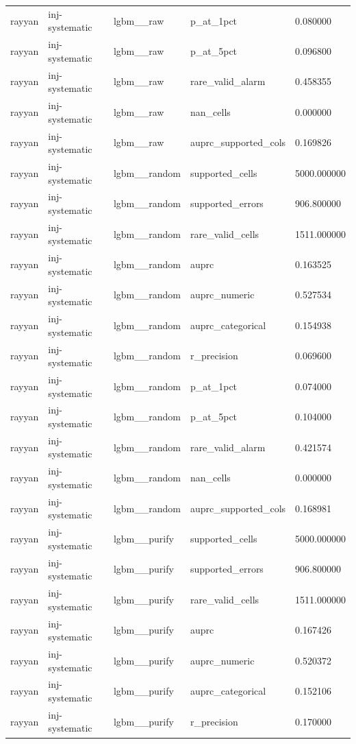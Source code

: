 \begin{tabular}{lllll}
rayyan & inj-systematic & lgbm\_\_raw & p\_at\_1pct & 0.080000 \\
rayyan & inj-systematic & lgbm\_\_raw & p\_at\_5pct & 0.096800 \\
rayyan & inj-systematic & lgbm\_\_raw & rare\_valid\_alarm & 0.458355 \\
rayyan & inj-systematic & lgbm\_\_raw & nan\_cells & 0.000000 \\
rayyan & inj-systematic & lgbm\_\_raw & auprc\_supported\_cols & 0.169826 \\
rayyan & inj-systematic & lgbm\_\_random & supported\_cells & 5000.000000 \\
rayyan & inj-systematic & lgbm\_\_random & supported\_errors & 906.800000 \\
rayyan & inj-systematic & lgbm\_\_random & rare\_valid\_cells & 1511.000000 \\
rayyan & inj-systematic & lgbm\_\_random & auprc & 0.163525 \\
rayyan & inj-systematic & lgbm\_\_random & auprc\_numeric & 0.527534 \\
rayyan & inj-systematic & lgbm\_\_random & auprc\_categorical & 0.154938 \\
rayyan & inj-systematic & lgbm\_\_random & r\_precision & 0.069600 \\
rayyan & inj-systematic & lgbm\_\_random & p\_at\_1pct & 0.074000 \\
rayyan & inj-systematic & lgbm\_\_random & p\_at\_5pct & 0.104000 \\
rayyan & inj-systematic & lgbm\_\_random & rare\_valid\_alarm & 0.421574 \\
rayyan & inj-systematic & lgbm\_\_random & nan\_cells & 0.000000 \\
rayyan & inj-systematic & lgbm\_\_random & auprc\_supported\_cols & 0.168981 \\
rayyan & inj-systematic & lgbm\_\_purify & supported\_cells & 5000.000000 \\
rayyan & inj-systematic & lgbm\_\_purify & supported\_errors & 906.800000 \\
rayyan & inj-systematic & lgbm\_\_purify & rare\_valid\_cells & 1511.000000 \\
rayyan & inj-systematic & lgbm\_\_purify & auprc & 0.167426 \\
rayyan & inj-systematic & lgbm\_\_purify & auprc\_numeric & 0.520372 \\
rayyan & inj-systematic & lgbm\_\_purify & auprc\_categorical & 0.152106 \\
rayyan & inj-systematic & lgbm\_\_purify & r\_precision & 0.170000 \\

\end{tabular}
